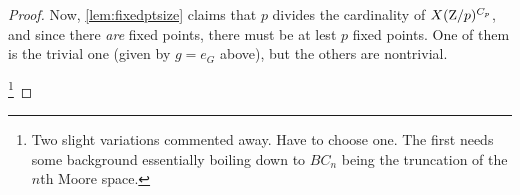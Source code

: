 \begin{proof}
 Now, \cref{lem:fixedptsize} claims that $p$ divides the cardinality of $X(\mathrm{Z}/p)^{C_p}$, and since there \emph{are} fixed points, there must be at lest $p$ fixed points.  One of them is the trivial one (given by $g=e_G$ above), but the others are nontrivial.


\footnote{Two slight variations commented away.  Have to choose one.  The first needs some background essentially boiling down to $BC_n$ being the truncation of the $n$th Moore space.



}
\end{proof}
